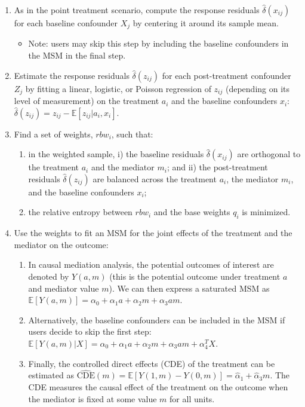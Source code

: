 \begin{enumerate}
\def\labelenumi{\arabic{enumi}.}
\tightlist
\item
  As in the point treatment scenario, compute the response residuals
  \(\hat{\delta}(x_{ij})\) for each baseline confounder \(X_{j}\) by
  centering it around its sample mean.

  \begin{itemize}
  \tightlist
  \item
    Note: users may skip this step by including the baseline confounders
    in the MSM in the final step.
  \end{itemize}
\item
  Estimate the response residuals \(\hat{\delta}(z_{ij})\) for each
  post-treatment confounder \(Z_{j}\) by fitting a linear, logistic, or
  Poisson regression of \(z_{ij}\) (depending on its level of
  measurement) on the treatment \(a_{i}\) and the baseline confounders
  \(x_{i}\):
  \(\hat{\delta}(z_{ij})=z_{ij}-\mathbb{E}[z_{ij}|a_{i},x_{i}]\).
\item
  Find a set of weights, \(rbw_{i}\), such that:

  \begin{enumerate}
  \def\labelenumii{\alph{enumii})}
  \tightlist
  \item
    in the weighted sample, i) the baseline residuals
    \(\hat{\delta}(x_{ij})\) are orthogonal to the treatment \(a_{i}\)
    and the mediator \(m_{i}\); and ii) the post-treatment residuals
    \(\hat{\delta}(z_{ij})\) are balanced across the treatment
    \(a_{i}\), the mediator \(m_{i}\), and the baseline confounders
    \(x_{i}\);
  \item
    the relative entropy between \(rbw_{i}\) and the base weights
    \(q_{i}\) is minimized.
  \end{enumerate}
\item
  Use the weights to fit an MSM for the joint effects of the treatment
  and the mediator on the outcome:

  \begin{enumerate}
  \def\labelenumii{\alph{enumii})}
  \tightlist
  \item
    In causal mediation analysis, the potential outcomes of interest are
    denoted by \(Y(a,m)\) (this is the potential outcome under treatment
    \(a\) and mediator value \(m\)). We can then express a saturated MSM
    as
    \(\mathbb{E}[Y(a,m)]=\alpha_{0}+\alpha_{1}a+\alpha_{2}m+\alpha_{3}am\).
  \item
    Alternatively, the baseline confounders can be included in the MSM
    if users decide to skip the first step:
    \(\mathbb{E}[Y(a,m)|X]=\alpha_{0}+\alpha_{1}a+\alpha_{2}m+\alpha_{3}am+\alpha_{4}^{T}X\).
  \item
    Finally, the controlled direct effects (CDE) of the treatment can be
    estimated as
    \(\widehat{\text{CDE}}(m)=\mathbb{E}[Y(1,m)-Y(0,m)]=\hat{\alpha}_{1}+\hat{\alpha}_{3}m\).
    The CDE measures the causal effect of the treatment on the outcome
    when the mediator is fixed at some value \(m\) for all units.
  \end{enumerate}
\end{enumerate}

